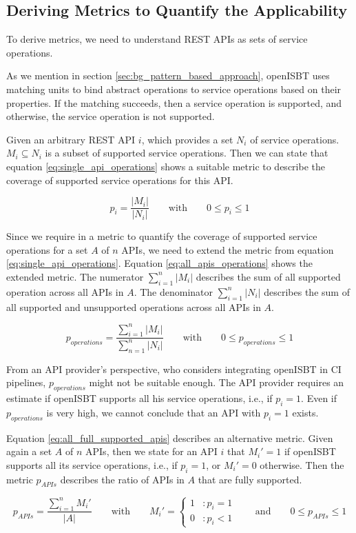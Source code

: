 
\subsection{Deriving Metrics to Quantify the Applicability}
\label{sec:eval_tool:deriving_coverage_criteria}
To derive metrics, we need to understand  REST APIs as sets of service operations. 

As we mention in section \ref{sec:bg_pattern_based_approach}, openISBT uses matching units to bind abstract operations to service operations based on their properties. 
If the matching succeeds, then a service operation is supported, and otherwise, the service operation is not supported.


Given an arbitrary REST API \(i\), which provides a set \(N_i\) of service operations. \(M_i \subseteq N_i\) is a subset of supported service operations. Then we can state that equation \ref{eq:single_api_operations} shows a suitable metric to describe the coverage of supported service operations for this API.

\begin{equation}
\label{eq:single_api_operations}
{p_{i} = \frac{|M_i|}{|N_i|} }
   \qquad\mathrm{with}\qquad 
{0 \leq p_{i} \leq 1 }
\end{equation}

Since we require in a metric to quantify the coverage of supported service operations for a set \(A\) of \(n\) APIs, we need to extend the metric from equation \ref{eq:single_api_operations}.
Equation \ref{eq:all_apis_operations} shows the extended metric. 
The numerator \(\sum_{i=1}^{n} |M_i|\) describes the sum of all supported operation across all APIs in \(A\). The denominator \(\sum_{i=1}^{n} |N_i|\) describes the sum of all supported and unsupported operations across all APIs in \(A\).

\begin{equation}
\label{eq:all_apis_operations}
{p_{operations} = \frac{\sum_{i=1}^{n} |M_i|}{\sum_{n=1}^{n} |N_i|}}
   \qquad\mathrm{with}\qquad 
{0 \leq p_{operations} \leq 1 }
\end{equation}


From an API provider's perspective, who considers integrating openISBT in CI pipelines, \(p_{operations}\)  might not be suitable enough. The API provider requires an estimate if openISBT supports all his service operations, i.e., if \(p_{i}=1\). Even if \(p_{operations}\) is very high, we cannot conclude that an API with \(p_{i}=1\) exists.

Equation \ref{eq:all_full_supported_apis} describes an alternative metric. Given again a set \(A\) of \(n\) APIs, then we state for an API \(i\) that \(M_{i}'=1\) if openISBT supports all its service operations, i.e., if \(p_{i}=1\), or \(M_{i}'=0\) otherwise.
Then the metric \(p_{APIs}\) describes the ratio of APIs in \(A\) that are fully supported.

\begin{equation}
\label{eq:all_full_supported_apis}
{p_{APIs} = \frac{\sum_{i=1}^{n} M_{i}'}{|A|}}
   \qquad\mathrm{with}\qquad 
 M_{i}' = \left\{
  \begin{array}{lr}
    1 & : p_i = 1\\
    0 & : p_i < 1
  \end{array}
\right.
   \qquad\mathrm{and}\qquad 
{0 \leq p_{APIs} \leq 1 }
\end{equation}
